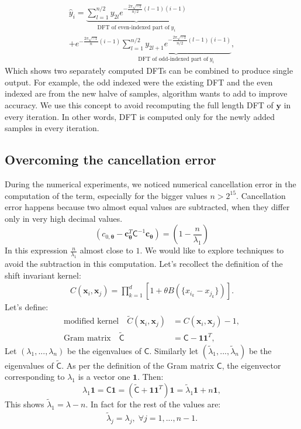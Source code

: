 \documentclass[twocolumn]{svjour3}          %
\newcommand{\bm}[1]{\boldsymbol{#1}}
\newcommand{\vtheta}{{\bm{\theta}}}
\newcommand{\vc}{\bm{c}}
\newcommand{\vx}{\bm{x}}
\newcommand{\vy}{\bm{y}}
\newcommand{\vone}{\bm{1}}
\newcommand{\mC}{\mathsf{C}}
\newcommand{\mCInv}{{\mathsf{C}^{-1}}}
\newcommand{\tmC}{\widetilde{\mathsf{C}}}
\newcommand{\tlambda}{\tilde{\lambda}}
\begin{document}
\begin{multline*}
\hat{y}_i =  
\underbrace{
\sum_{l=1}^{n/2} y_{2l} 
e^{- \frac{2\pi \sqrt{-1}}{n/2} (l-1)( i-1) }
}_{\text{DFT of even-indexed part of}\; y_i}
\\
+
e^{- \frac{2\pi \sqrt{-1}}{n} (i-1) }
\underbrace{
\sum_{l=1}^{n/2} y_{2l+1} 
e^{- \frac{2\pi \sqrt{-1}}{n/2} (l-1)( i-1) }
}_{\text{DFT of odd-indexed part of}\; y_i},
\end{multline*}
Which shows two separately computed DFTs can be combined to produce single output. For example, the odd indexed were the existing DFT and the even indexed are from the new halve of samples, algorithm wants to add to improve accuracy.
We use this concept to avoid recomputing the full length DFT of $\vy$ in every iteration. In other words, DFT is computed only for the newly added samples in every iteration.















\subsection{Overcoming the cancellation error}
During the numerical experiments, we noticed numerical cancellation error in the computation of the term, especially for the bigger values $n > 2^{15}$. Cancellation error happens because two almost equal values are subtracted, when they differ only in very high decimal values. 
\[
\left(c_{0,\vtheta} - {\vc}_{\vtheta}^T\mCInv\vc_{\vtheta} \right) = 
\left(
1 - \frac{n }{\lambda_1} \right)
\]
In this expression $\frac{n}{\lambda_1}$ almost close to $1$.
We would like to explore techniques to avoid the subtraction in this computation.
Let's recollect the definition of the shift invariant kernel:
\begin{align*}
C(\vx_i, \vx_j) = \prod_{k=1}^d \left[1 + \theta B(\{x_{i_k} - x_{j_k}\}) \right].
\end{align*}
Let's define:
\begin{align*}
\text{modified kernel} \quad \widetilde{C}(\vx_i, \vx_j) &= C(\vx_i, \vx_j) - 1,
\\
\text{Gram matrix} \quad \tmC &= \mC - \vone \vone^T,
\end{align*}
Let $(\lambda_1, ..., \lambda_n)$ be the eigenvalues of $\mC$. Similarly let $(\tlambda_1, ..., \tlambda_n)$ be the eigenvalues of $\tmC$. As per the definition of the Gram matrix $\mC$, the eigenvector corresponding to $\lambda_1$ is a vector one $\vone$. 
Then:
\begin{equation}
\nonumber
\lambda_1 \vone  = \mC \vone 
 = (\tmC + \vone \vone^T) \vone
 = \tlambda_1 \vone + n \vone,
\end{equation}
This shows $\tlambda_1 = \lambda - n$. In fact for the rest of the values are:
\begin{align}
\label{eqn:lambda_to_tlambda_relation}
\tlambda_j = \lambda_j, \; \forall j=1,...,n-1.
\end{align}
\end{document}
